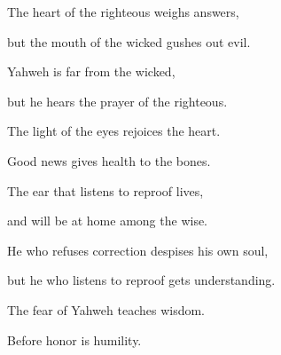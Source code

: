 {\par }{\Q {}The heart of the righteous weighs answers,
\par }{\QB but the mouth of the wicked gushes out evil.
\par }{\Q {}Yahweh is far from the wicked,
\par }{\QB but he hears the prayer of the righteous.
\par }{\Q {}The light of the eyes rejoices the heart.
\par }{\QB Good news gives health to the bones.
\par }{\Q {}The ear that listens to reproof lives,
\par }{\QB and will be at home among the wise.
\par }{\Q {}He who refuses correction despises his own soul,
\par }{\QB but he who listens to reproof gets understanding.
\par }{\Q {}The fear of Yahweh teaches wisdom.
\par }{\QB Before honor is humility.

}
